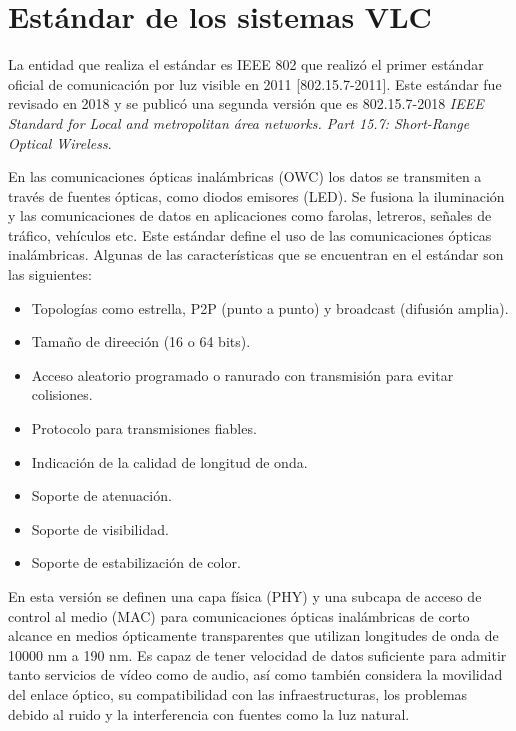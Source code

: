 
\label{chp:Utiliz}
\minitoc

\section{Estándar de los sistemas VLC}
La entidad que realiza el estándar es IEEE 802 que realizó el primer estándar oficial de
comunicación por luz visible en 2011 [802.15.7-2011]. Este estándar fue revisado en
2018 y se publicó una segunda versión que es 802.15.7-2018 \textit{IEEE Standard for Local
and metropolitan área networks. Part 15.7: Short-Range Optical Wireless}.

En las comunicaciones ópticas inalámbricas (OWC) los datos se transmiten a través de 
fuentes ópticas, como diodos emisores (LED). Se fusiona la iluminación y las 
comunicaciones de datos en aplicaciones como farolas, letreros, señales de tráfico, 
vehículos etc. Este estándar define el uso de las comunicaciones ópticas inalámbricas.
Algunas de las características que se encuentran en el estándar son las siguientes:
\begin{itemize}
    \item Topologías como estrella, P2P (punto a punto) y broadcast (difusión amplia).
    \item Tamaño de direeción (16 o 64 bits).
    \item Acceso aleatorio programado o ranurado con transmisión para evitar colisiones.
    \item Protocolo para transmisiones fiables.
    \item Indicación de la calidad de longitud de onda.
    \item Soporte de atenuación.
    \item Soporte de visibilidad.
    \item Soporte de estabilización de color.
\end{itemize}

En esta versión se definen una capa física (PHY) y una subcapa de acceso de control 
al medio (MAC) para comunicaciones ópticas inalámbricas de corto alcance en medios 
ópticamente transparentes que utilizan longitudes de onda de 10000 nm a 190 nm. Es 
capaz de tener velocidad de datos suficiente para admitir tanto servicios de vídeo como 
de audio, así como también considera la movilidad del enlace óptico, su compatibilidad 
con las infraestructuras, los problemas debido al ruido y la interferencia con fuentes 
como la luz natural.

